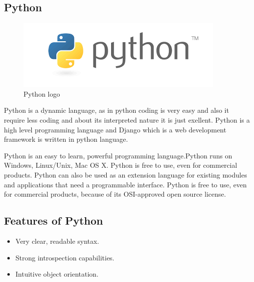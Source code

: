 \subsection{Python}
\begin{figure}[h]
	\centering \includegraphics[scale=0.3]{input/images/python.png}
	\caption{Python logo}
\end{figure}
\noindent Python is a dynamic language, as in python coding is very easy and 
also it require less coding and about its interpreted nature it is 
just exellent. Python is a high level programming language and Django 
which is a web development framework is written in python language.

Python is an easy to learn, powerful programming language.Python runs 
on Windows, Linux/Unix, Mac OS X. Python is free to use, even for 
commercial products. Python can also be used as an extension language 
for existing modules and applications that need a programmable interface.  
Python is free to use, even for commercial products, because of its 
OSI-approved open source license.
\subsection{Features of Python}
\begin{itemize}
	\item Very clear, readable syntax.
	\item Strong introspection capabilities.
	\item Intuitive object orientation.

\end{itemize}

